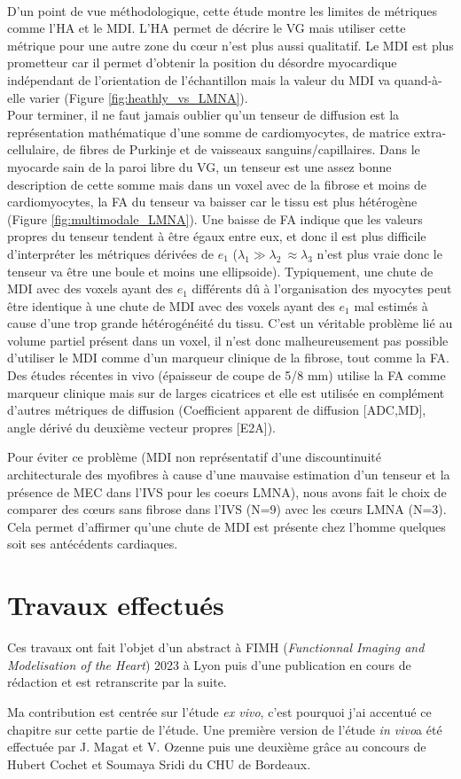 \\
D’un point de vue méthodologique, cette étude montre les limites de métriques comme l’HA et le MDI. L’HA permet de décrire le VG mais utiliser cette métrique pour une autre zone du cœur n’est plus aussi qualitatif. Le MDI est plus prometteur car il permet d’obtenir la position du désordre myocardique indépendant de l’orientation de l’échantillon mais la valeur du MDI va quand-à-elle varier (Figure \ref{fig:heathly_vs_LMNA}).
\\ 
Pour terminer, il ne faut jamais oublier qu’un tenseur de diffusion est la représentation mathématique d’une somme de cardiomyocytes, de matrice extra-cellulaire, de fibres de Purkinje et de vaisseaux sanguins/capillaires. Dans le myocarde sain de la paroi libre du VG, un tenseur est une assez bonne description de cette somme mais dans un voxel avec de la fibrose et moins de cardiomyocytes, la FA du tenseur va baisser car le tissu est plus hétérogène (Figure \ref{fig:multimodale_LMNA}). Une baisse de FA indique que les valeurs propres du tenseur tendent à être égaux entre eux, et donc il est plus difficile d’interpréter les métriques dérivées de $e_1$ ($\lambda_1\gg\lambda_2\ \approx\lambda_3$ n'est plus vraie donc le tenseur va être une boule et moins une ellipsoide). Typiquement, une chute de MDI avec des voxels ayant des $e_1$ différents dû à l’organisation des myocytes peut être identique à une chute de MDI avec des voxels ayant des $e_1$ mal estimés à cause d’une trop grande hétérogénéité du tissu. C’est un véritable problème lié au volume partiel présent dans un voxel, il n’est donc malheureusement pas possible d’utiliser le MDI comme d’un marqueur clinique de la fibrose, tout comme la FA. Des études récentes in vivo (épaisseur de coupe de 5/8 mm) utilise la FA comme marqueur clinique mais sur de larges cicatrices et elle est utilisée en complément d’autres métriques de diffusion (Coefficient apparent de diffusion [ADC,MD], angle dérivé du deuxième vecteur propres [E2A]).\cite{Das2023}

Pour éviter ce problème (MDI non représentatif d'une discountinuité architecturale des myofibres à cause d'une mauvaise estimation d'un tenseur et la présence de MEC dans l'IVS pour les coeurs LMNA), nous avons fait le choix de comparer des cœurs sans fibrose dans l’IVS (N=9) avec les cœurs LMNA (N=3). Cela permet d’affirmer qu’une chute de MDI est présente chez l’homme quelques soit ses antécédents cardiaques. 

\section{Travaux effectués}

Ces travaux ont fait l’objet d’un abstract à FIMH (\textit{Functionnal Imaging and Modelisation of the Heart}) 2023 à Lyon puis d’une publication en cours de rédaction et est retranscrite par la suite.

Ma contribution est centrée sur l’étude \textit{ex vivo}, c’est pourquoi j’ai accentué ce chapitre sur cette partie de l’étude. Une première version de l’étude \textit{in vivo}a été effectuée par J. Magat et V. Ozenne puis une deuxième grâce au concours de Hubert Cochet et Soumaya Sridi du CHU de Bordeaux. 
 


